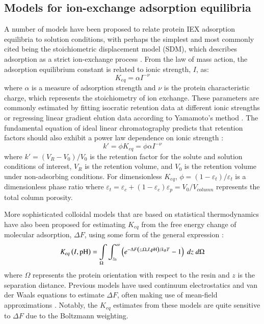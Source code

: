 \documentclass[preprint,review,12pt]{elsarticle}
\begin{document}
    \subsection{Models for ion-exchange adsorption equilibria} \label{ssec:electrostatics}
        A number of models have been proposed to relate protein IEX adsorption equilibria to solution conditions, with perhaps the simplest and most commonly cited being the stoichiometric displacement model (SDM), which describes adsorption as a strict ion-exchange process \cite{Boardman1955}. From the law of mass action, the adsorption equilibrium constant is related to ionic strength, $I$, as:
        \begin{equation} \label{eq:sdm}
            K_{eq} = \alpha I^{-\nu}
        \end{equation}
        where $\alpha$ is a measure of adsorption strength and $\nu$ is the protein characteristic charge, which represents the stoichiometry of ion exchange. These parameters are commonly estimated by fitting isocratic retention data at different ionic strengths or regressing linear gradient elution data according to Yamamoto's method \cite{Yamamoto1987}. The fundamental equation of ideal linear chromatography predicts that retention factors should also exhibit a power law dependence on ionic strength \cite{Guiochon2006}:
        \begin{equation} \label{eq:fundamental}
            k' = \phi K_{eq} = \phi \alpha I^{-\nu}
        \end{equation}
        where $k' = (V_R - V_0)/V_0$ is the retention factor for the solute and solution conditions of interest, $V_R$ is the retention volume, and $V_0$ is the retention volume under non-adsorbing conditions. For dimensionless $K_{eq}$, $\phi = (1 - \varepsilon_t)/\varepsilon_t$ is a dimensionless phase ratio where $\varepsilon_t = \varepsilon_c + (1 - \varepsilon_c) \varepsilon_p = V_0/V_{column}$ represents the total column porosity.

        More sophisticated colloidal models that are based on statistical thermodynamics have also been proposed for estimating $K_{eq}$ from the free energy change of molecular adsorption, $\Delta F$, using some form of the general expression \cite{Asthagiri1997}:
        \begin{equation} \label{eq:keq stat thermo}
            K_{eq}\left(I, \mathrm{pH} \right) = \int \displaylimits_\Omega \int_{z_0}^{\infty} \left( e^{-\Delta F \left( z, \Omega, I, \mathrm{pH} \right)/k_BT} - 1 \right) \; dz \; d\Omega
        \end{equation}
        where $\Omega$ represents the protein orientation with respect to the resin and $z$ is the separation distance. Previous models have used continuum electrostatics and van der Waals equations to estimate $\Delta F$, often making use of mean-field approximations \cite{Guelat2012, Briskot2019}. Notably, the $K_{eq}$ estimates from these models are quite sensitive to $\Delta F$ due to the Boltzmann weighting.
\end{document}
